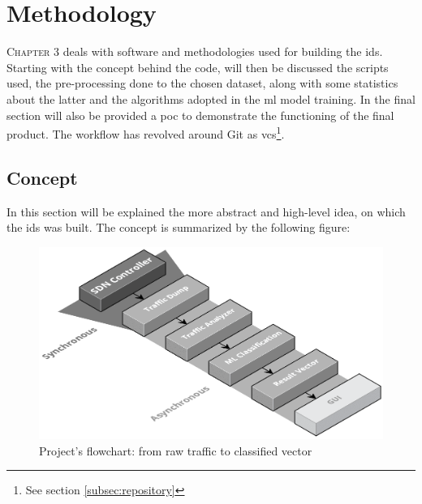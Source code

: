 \chapter{Methodology}
\label{chap:methodology}

\lettrine[lines=4, findent=3pt, nindent=0pt]{C}{hapter} 3 deals with software and methodologies used for building the \gls{ids}. Starting with the concept behind the code, will then be discussed the scripts used, the pre-processing done to the chosen dataset, along with some statistics about the latter and the algorithms adopted in the \gls{ml} model training. In the final section will also be provided a \gls{poc} to demonstrate the functioning of the final product. The workflow has revolved around Git as \gls{vcs}\footnote{See section \ref{subsec:repository}}.


\section{Concept}
\label{sec:concept}

In this section will be explained the more abstract and high-level idea, on which the \gls{ids} was built. The concept is summarized by the following figure:

\begin{figure}[h!]
    \centering
    \includegraphics[scale=0.32]{assets/figures/chapter3/concept-components.png}
    \caption{Project's flowchart: from raw traffic to classified vector}
    \label{fig:concept-components}
\end{figure}

